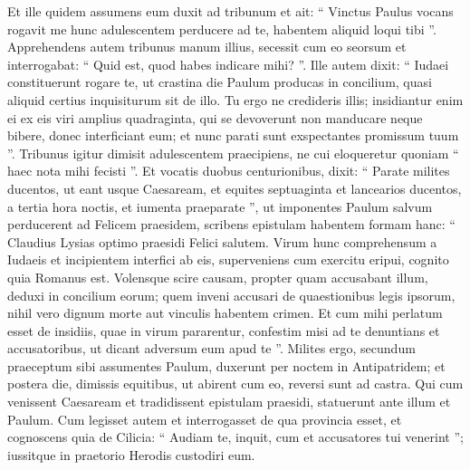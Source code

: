 \begin{biblechapter}
\begin{biblechapter}
\begin{biblechapter}
\begin{biblechapter}
\begin{biblechapter}
\begin{biblechapter}
\begin{biblechapter}
\begin{biblechapter}
\begin{biblechapter}
\begin{biblechapter}
\begin{biblechapter}
\begin{biblechapter}
\begin{biblechapter}
\begin{biblechapter}
\begin{biblechapter}
\begin{biblechapter}
\begin{biblechapter}
\begin{biblechapter}
\begin{biblechapter}
\begin{biblechapter}
\begin{biblechapter}
\begin{biblechapter}
\begin{biblechapter}
 \verse Et ille quidem assumens eum duxit ad tribunum et ait: “ Vinctus Paulus vocans rogavit me hunc adulescentem perducere ad te, habentem aliquid loqui tibi ”. 
\verse Apprehendens autem tribunus manum illius, secessit cum eo seorsum et interrogabat: “ Quid est, quod habes indicare mihi? ”. 
\verse Ille autem dixit: “ Iudaei constituerunt rogare te, ut crastina die Paulum producas in concilium, quasi aliquid certius inquisiturum sit de illo. 
\verse Tu ergo ne credideris illis; insidiantur enim ei ex eis viri amplius quadraginta, qui se devoverunt non manducare neque bibere, donec interficiant eum; et nunc parati sunt exspectantes promissum tuum ”.
 \verse Tribunus igitur dimisit adulescentem praecipiens, ne cui eloqueretur quoniam “ haec nota mihi fecisti ”. 
\verse Et vocatis duobus centurionibus, dixit: “ Parate milites ducentos, ut eant usque Caesaream, et equites septuaginta et lancearios ducentos, a tertia hora noctis, 
\verse et iumenta praeparate ”, ut imponentes Paulum salvum perducerent ad Felicem praesidem, 
\verse scribens epistulam habentem formam hanc: 
\verse “ Claudius Lysias optimo praesidi Felici salutem. 
\verse Virum hunc comprehensum a Iudaeis et incipientem interfici ab eis, superveniens cum exercitu eripui, cognito quia Romanus est. 
\verse Volensque scire causam, propter quam accusabant illum, deduxi in concilium eorum; 
\verse quem inveni accusari de quaestionibus legis ipsorum, nihil vero dignum morte aut vinculis habentem crimen. 
\verse Et cum mihi perlatum esset de insidiis, quae in virum pararentur, confestim misi ad te denuntians et accusatoribus, ut dicant adversum eum apud te ”.
 \verse Milites ergo, secundum praeceptum sibi assumentes Paulum, duxerunt per noctem in Antipatridem; 
\verse et postera die, dimissis equitibus, ut abirent cum eo, reversi sunt ad castra. 
\verse Qui cum venissent Caesaream et tradidissent epistulam praesidi, statuerunt ante illum et Paulum. 
\verse Cum legisset autem et interrogasset de qua provincia esset, et cognoscens quia de Cilicia: 
\verse “ Audiam te, inquit, cum et accusatores tui venerint ”; iussitque in praetorio Herodis custodiri eum.
 

\end{biblechapter}
\end{biblechapter}
\end{biblechapter}
\end{biblechapter}
\end{biblechapter}
\end{biblechapter}
\end{biblechapter}
\end{biblechapter}
\end{biblechapter}
\end{biblechapter}
\end{biblechapter}
\end{biblechapter}
\end{biblechapter}
\end{biblechapter}
\end{biblechapter}
\end{biblechapter}
\end{biblechapter}
\end{biblechapter}
\end{biblechapter}
\end{biblechapter}
\end{biblechapter}
\end{biblechapter}
\end{biblechapter}
